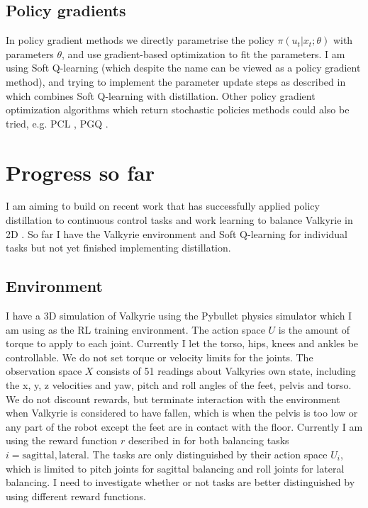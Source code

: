 \documentclass[a4paper]{article}
\begin{document}
\subsection{Policy gradients}
In policy gradient methods we directly parametrise the policy $\pi(u_{t} \vert x_{t}; \theta)$ with parameters $\theta$, and use gradient-based optimization to fit the parameters. I am using Soft Q-learning \citep{haarnoja2017reinforcement} (which despite the name can be viewed as a policy gradient method), 
and trying to implement the parameter update steps as described in \citep{teh2017distral} which combines Soft Q-learning with distillation. Other policy gradient optimization algorithms which return stochastic policies methods could also be tried, e.g. PCL \citep{nachum2017bridging}, PGQ \citep{o2016combining}. 

\section{Progress so far}
I am aiming to build on recent work that has successfully applied policy distillation to continuous control tasks \citep{teh2017distral, berseth2018progressive} and work learning to balance Valkyrie in 2D \citep{yang2017emergence}. 
So far I have the Valkyrie environment and Soft Q-learning for individual tasks but not yet finished implementing distillation. 

\subsection{Environment}
I have a 3D simulation of Valkyrie using the Pybullet physics simulator which I am using as the RL training environment.
The action space $U$ is the amount of torque to apply to each joint. Currently I let the torso, hips, knees and ankles be controllable.
We do not set torque or velocity limits for the joints.
The observation space $X$ consists of 51 readings about Valkyries own state, including the x, y, z velocities and yaw, pitch and roll angles of the feet, pelvis and torso. 
We do not discount rewards, but terminate interaction with the environment when Valkyrie is considered to have fallen, which is when the pelvis is too low or any part of the robot except the feet are in contact with the floor. 
Currently I am using the reward function $r$ described in \citep{yang2017emergence} for both balancing tasks $i={\mathrm{sagittal, lateral}}$. 
The tasks are only distinguished by their action space $U_i$, which is limited to pitch joints for sagittal balancing and roll joints for lateral balancing. I need to investigate whether or not tasks are better distinguished by using different reward functions.
\end{document}
